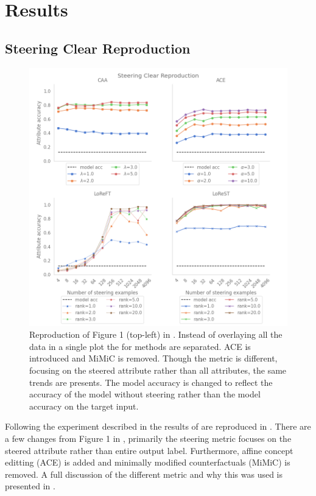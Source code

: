 \chapter{Results}

\section{Steering Clear Reproduction}

\begin{figure}
    \centering
    \captionsetup{width=\textwidth}
    \includegraphics[width=\textwidth]{figures/steering_clear.png}
    \caption{
        Reproduction of Figure 1 (top-left) in \citet{steering-clear}.
        Instead of overlaying all the data in a single plot the for methods are separated.
        ACE \citep{ace} is introduced and MiMiC \citep{mimic} is removed.
        Though the metric is different, focusing on the steered attribute rather than all attributes, the same trends are presents.
        The model accuracy is changed to reflect the accuracy of the model without steering rather than the model accuracy on the target input.
    }
    \label{fig:steering-clear}
\end{figure}

Following the experiment described in  the results of \cite{steering-clear} are reproduced in .
There are a few changes from Figure 1 in \cite{steering-clear}, primarily the steering metric focuses on the steered attribute rather than entire output label.
Furthermore, affine concept editting (ACE) \citep{ace} is added and minimally modified counterfactuals (MiMiC) \citep{mimic} is removed.
A full discussion of the different metric and why this was used is presented in .

